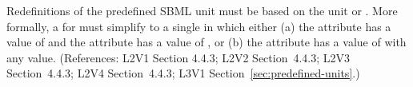 Redefinitions of the predefined SBML unit  must be based on the unit
 or .  More formally, a \UnitDefinition
for  must simplify to a single \Unit in which either (a) the
 attribute has a value of  and the
 attribute has a value of , or (b) the
 attribute has a value of  with
any  value.  (References: L2V1 Section 4.4.3; L2V2
Section~4.4.3; L2V3 Section~4.4.3; L2V4 Section~4.4.3; L3V1 Section~\ref{sec:predefined-units}.)
